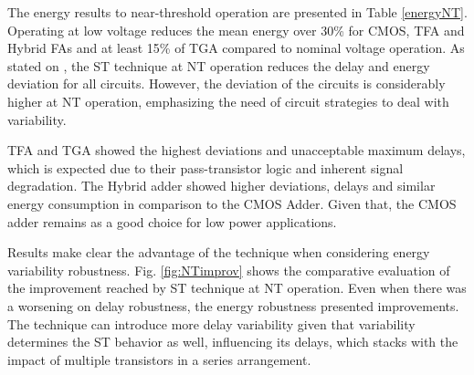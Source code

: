 \documentclass[ecp,tc, english]{iiufrgs}
\begin{document}
The energy results to near-threshold operation are presented in Table \ref{energyNT}. Operating at low voltage reduces the mean energy over 30\% for CMOS, TFA and Hybrid FAs and at least 15\% of TGA compared to nominal voltage operation. As stated on \cite{dokania2015circuit}, the ST technique at NT operation reduces the delay and energy deviation for all circuits. However, the deviation of the circuits is considerably higher at NT operation, emphasizing the need of circuit strategies to deal with variability. 

TFA and TGA showed the highest deviations and unacceptable maximum delays, which is expected due to their pass-transistor logic and inherent signal degradation. The Hybrid adder showed higher deviations, delays and similar energy consumption in comparison to the CMOS Adder. Given that, the CMOS adder remains as a good choice for low power applications.

Results make clear the advantage of the technique when considering energy variability robustness. Fig. \ref{fig:NTimprov} shows the comparative evaluation of the improvement reached by ST technique at NT operation. Even when there was a worsening on delay robustness, the energy robustness presented improvements. The technique can introduce more delay variability given that variability determines the ST behavior as well, influencing its delays, which stacks with the impact of multiple transistors in a series arrangement.
\end{document}
